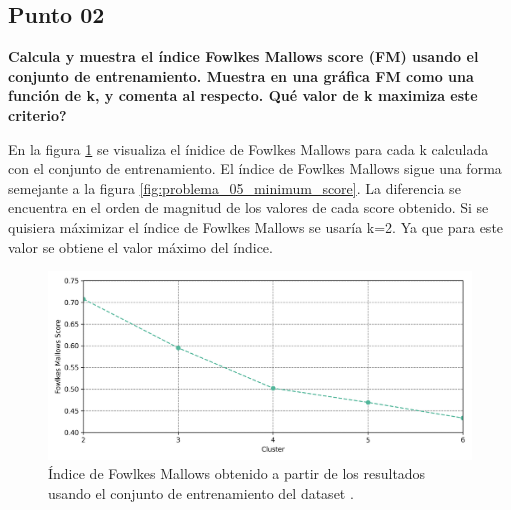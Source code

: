 \subsection*{Punto 02}

\textbf{Calcula y muestra el índice Fowlkes Mallows score (FM) usando el conjunto de entrenamiento. Muestra en una gráfica FM como una función de k, y comenta al respecto. Qué valor de k maximiza este criterio?}

En la figura \ref{fig:fowlkes_score} se visualiza el ínidice de Fowlkes Mallows para cada k calculada con el conjunto de entrenamiento. El índice de Fowlkes Mallows sigue una forma semejante a la figura \ref{fig:problema_05_minimum_score}. La diferencia se encuentra en el orden de magnitud de los valores de cada score obtenido. Si se quisiera máximizar el índice de Fowlkes Mallows se usaría k=2. Ya que para este valor se obtiene el valor máximo del índice.

\begin{figure}[H]
    \centering
    \includegraphics[width=15cm]{Graphics/Problema_05/fowlkes_mallows_score.png}
    \caption{Índice de Fowlkes Mallows obtenido a partir de los resultados usando el conjunto de entrenamiento del dataset .}
    \label{fig:fowlkes_score}
\end{figure}